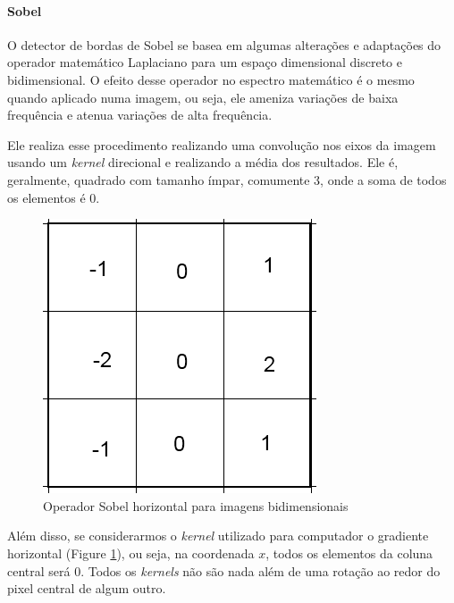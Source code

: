 \documentclass[10pt,twocolumn,letterpaper]{article}
\begin{document}
\paragraph{Sobel}
	O detector de bordas de Sobel{\footnotesize \cite{sobel2}} se basea em algumas
alterações e adaptações do operador matemático Laplaciano{\footnotesize \cite{laplace1}}
para um espaço dimensional discreto e bidimensional{\footnotesize \cite{laplace2}}. O
efeito desse operador no espectro matemático é o mesmo quando aplicado numa imagem,
ou seja, ele ameniza variações de baixa frequência e atenua variações de alta frequência.{\footnotesize \cite{sobel2}}

	Ele realiza esse procedimento realizando uma convolução nos eixos da imagem
usando um \emph{kernel} direcional e realizando a média dos resultados. Ele é,
geralmente, quadrado com tamanho ímpar, comumente 3, onde a soma de todos
os elementos é 0.


\begin{figure}[!htp]
\centering
\includegraphics[width=0.5\columnwidth]{SobelGx}
\caption{Operador Sobel horizontal para imagens bidimensionais}
\label{fig:SobelGx}
\end{figure}

Além disso, se considerarmos o \emph{kernel} utilizado para computador o gradiente
horizontal (Figure \ref{fig:SobelGx}), ou seja, na coordenada $x$, todos os elementos
da coluna central será 0. Todos os \emph{kernels} não são nada além de uma rotação
ao redor do pixel central de algum outro.
\end{document}
